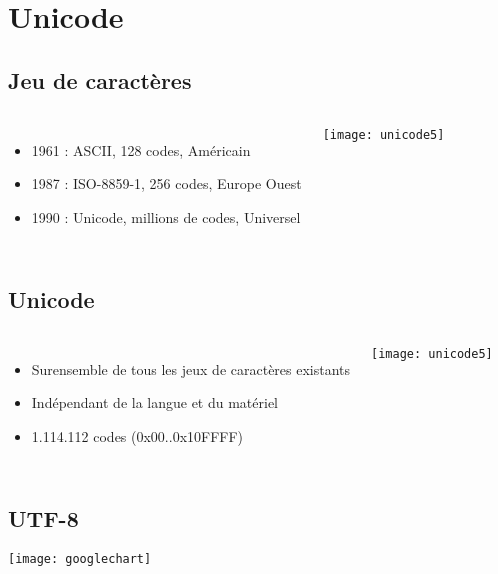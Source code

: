 \section{Unicode}

\subsection{Jeu de caractères}
\frame
{
    \begin{columns}[c]
            \begin{itemize}
            \item 1961 : ASCII, 128 codes, Américain
            \item 1987 : ISO-8859-1, 256 codes, Europe Ouest
            \item 1990 : Unicode, millions de codes, Universel
            \end{itemize}

            \texttt{[image: unicode5]}
    \end{columns}
}

\subsection{Unicode}
\frame
{
    \begin{columns}[c]
            \begin{itemize}
            \item Surensemble de tous les jeux de caractères existants
            \item Indépendant de la langue et du matériel
            \item 1.114.112 codes (0x00..0x10FFFF)
            \end{itemize}
            \texttt{[image: unicode5]}
    \end{columns}
}

\subsection{UTF-8}
\frame
{
    \begin{center}
        \texttt{[image: googlechart]}
    \end{center}
}

